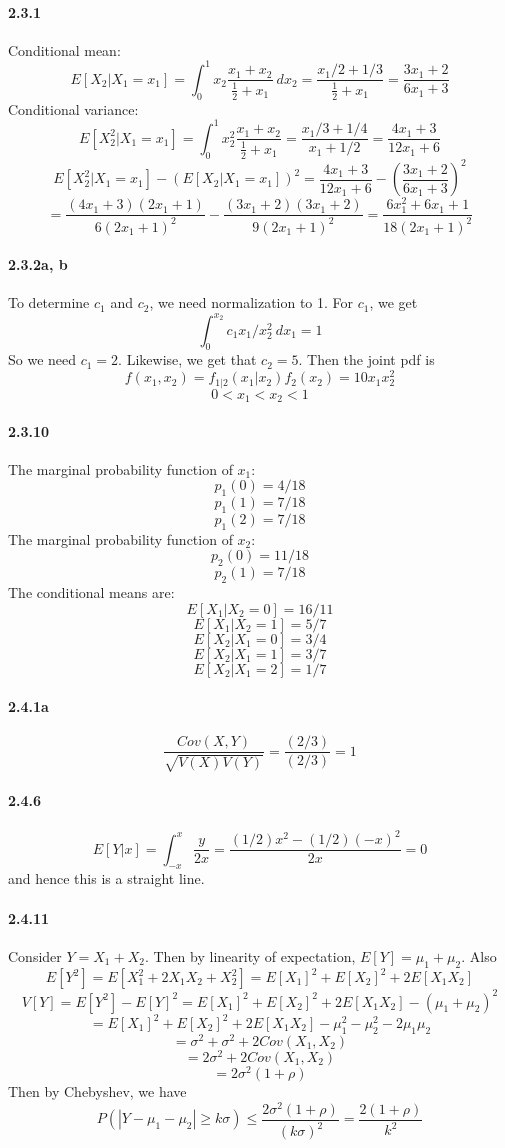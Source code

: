 \documentclass[10pt,letter]{article}
\begin{document}
\paragraph{2.3.1}
Conditional mean:
\[ E[X_2 | X_1 = x_1] = \int_0^1 x_2 \frac{x_1 + x_2}{\frac{1}{2} + x_1} \ dx_2 = \frac{x_1/2 + 1/3}{\frac{1}{2} + x_1} = \frac{3x_1 + 2}{6x_1 + 3} \]
Conditional variance:
\[ E[X_2^2 | X_1 = x_1] = \int_0^1 x_2^2 \frac{x_1 + x_2}{\frac{1}{2} + x_1} = \frac{x_1/3 + 1/4}{x_1 + 1/2} = \frac{4x_1 + 3}{12x_1 + 6} \]
\[ E[X_2^2 | X_1 = x_1] - (E[X_2 | X_1 = x_1])^2 = \frac{4x_1 + 3}{12x_1 + 6} - \left(\frac{3x_1 + 2}{6x_1 + 3}\right)^2 \]
\[= \frac{(4x_1 + 3)(2x_1 + 1)}{6(2x_1 + 1)^2} - \frac{(3x_1 + 2)(3x_1 + 2)}{9(2x_1 + 1)^2} = \frac{6x_1^2 + 6x_1 + 1}{18(2x_1+1)^2} \]
\paragraph{2.3.2a, b}
To determine $c_1$ and $c_2$, we need normalization to 1. For $c_1$, we get
\[ \int_0^{x_2} c_1x_1/x_2^2 \ dx_1 = 1  \]
So we need $c_1 = 2$. Likewise, we get that $c_2 = 5$.
Then the joint pdf is
\[ f(x_1, x_2) = f_{1|2}(x_1|x_2)f_2(x_2) = 10x_1x_2^2 \]
\[ 0 < x_1 < x_2 < 1 \]
\paragraph{2.3.10}
The marginal probability function of $x_1$:
\[ p_1(0) = 4/18 \]
\[ p_1(1) = 7/18 \]
\[ p_1(2) = 7/18 \]
The marginal probability function of $x_2$:
\[ p_2(0) = 11/18 \]
\[ p_2(1) = 7/18 \]
The conditional means are:
\[ E[X_1|X_2 = 0] = 16/11 \]
\[ E[X_1|X_2 = 1] = 5/7 \]
\[ E[X_2|X_1 = 0] = 3/4 \]
\[ E[X_2|X_1 = 1] = 3/7 \]
\[ E[X_2|X_1 = 2] = 1/7 \]
\paragraph{2.4.1a}
\[ \frac{Cov(X,Y)}{\sqrt{V(X)V(Y)}} = \frac{(2/3)}{(2/3)} = 1 \]
\paragraph{2.4.6}
\[ E[Y|x] = \int_{-x}^x \frac{y}{2x} = \frac{(1/2)x^2 - (1/2)(-x)^2}{2x} = 0 \]
and hence this is a straight line.
\paragraph{2.4.11}
Consider $Y = X_1 + X_2$. Then by linearity of expectation, $E[Y] = \mu_1 + \mu_2$. Also
\[ E[Y^2] = E[X_1^2 + 2X_1X_2 + X_2^2] = E[X_1]^2 + E[X_2]^2 + 2E[X_1X_2] \]
\[ V[Y] = E[Y^2] - E[Y]^2 = E[X_1]^2 + E[X_2]^2 + 2E[X_1X_2] - (\mu_1 + \mu_2)^2\]
 \[ = E[X_1]^2 + E[X_2]^2 + 2E[X_1X_2] - \mu_1^2 - \mu_2^2 - 2\mu_1\mu_2 \]
 \[ = \sigma^2 + \sigma^2 + 2Cov(X_1, X_2)\]
  \[ = 2\sigma^2 + 2Cov(X_1, X_2)\]
  \[ = 2\sigma^2(1 + \rho) \]
  Then by Chebyshev, we have
  \[ P(|Y - \mu_1 - \mu_2| \ge k\sigma) \le \frac{2\sigma^2(1 + \rho)}{(k\sigma)^2} = \frac{2(1+\rho)}{k^2} \]
\end{document}
